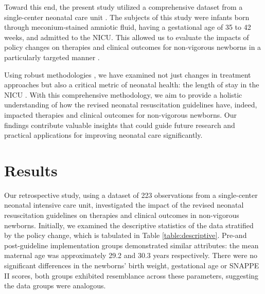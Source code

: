 \documentclass[11pt]{article}
\begin{document}
Toward this end, the present study utilized a comprehensive dataset from a single-center neonatal care unit \cite{Rahman2019IdentificationON, Mileder2021TelesimulationAA}. The subjects of this study were infants born through meconium-stained amniotic fluid, having a gestational age of 35 to 42 weeks, and admitted to the NICU. This allowed us to evaluate the impacts of policy changes on therapies and clinical outcomes for non-vigorous newborns in a particularly targeted manner \cite{Rahman2019IdentificationON, Mileder2021TelesimulationAA}. 

Using robust methodologies \cite{Thayyil2010CerebralMR, Munns2016GlobalCR, Salas2011PrognosticFI, Daz2006AnAO, Lee2012RevisitingTI}, we have examined not just changes in treatment approaches but also a critical metric of neonatal health: the length of stay in the NICU \cite{Thayyil2010CerebralMR, Munns2016GlobalCR, Salas2011PrognosticFI, Daz2006AnAO, Lee2012RevisitingTI}. With this comprehensive methodology, we aim to provide a holistic understanding of how the revised neonatal resuscitation guidelines have, indeed, impacted therapies and clinical outcomes for non-vigorous newborns. Our findings contribute valuable insights that could guide future research and practical applications for improving neonatal care significantly.

\section*{Results}

Our retrospective study, using a dataset of 223 observations from a single-center neonatal intensive care unit, investigated the impact of the revised neonatal resuscitation guidelines on therapies and clinical outcomes in non-vigorous newborns. Initially, we examined the descriptive statistics of the data stratified by the policy change, which is tabulated in Table \ref{table:descriptive}. Pre-and post-guideline implementation groups demonstrated similar attributes: the mean maternal age was approximately 29.2 and 30.3 years respectively. There were no significant differences in the newborns' birth weight, gestational age or SNAPPE II scores, both groups exhibited resemblance across these parameters, suggesting the data groups were analogous.
\end{document}
